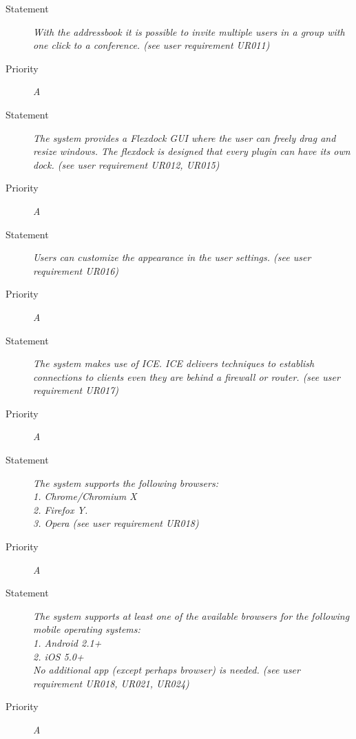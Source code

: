 \FR
\begin{description}
  \item[Statement]
    \textit{With the addressbook it is possible to invite multiple users in a group with one click to a conference. (see user requirement UR011)}
  \item[Priority]
    \textit{A}
\end{description}


\FR
\begin{description}
  \item[Statement]
    \textit{The system provides a \gls{Flexdock} GUI where the user can freely drag and resize windows. The flexdock is designed that every plugin can have its own dock. (see user requirement UR012, UR015)}
  \item[Priority]
    \textit{A}
\end{description}


\FR
\begin{description}
  \item[Statement]
    \textit{Users can customize the appearance in the user settings. (see user requirement UR016)}
  \item[Priority]
    \textit{A}
\end{description}


\FR
\begin{description}
  \item[Statement]
    \textit{The system makes use of \gls{ICE}. ICE delivers techniques to establish connections to clients even they are behind a firewall or router.  (see user requirement UR017)}
  \item[Priority]
    \textit{A}
\end{description}


\FR
\begin{description}
  \item[Statement]
    \textit{The system supports the following
      browsers:\\1. Chrome/Chromium X\\2. Firefox Y.\\ 3. Opera (see user requirement UR018)}
  \item[Priority]
    \textit{A}
\end{description}


\FR
\begin{description}
  \item[Statement]
    \textit{The system supports at least one of the available browsers
      for the following mobile operating systems:\\1. Android
      2.1+\\2. iOS 5.0+\\No additional app (except perhaps browser) is needed. (see user requirement UR018, UR021, UR024)}
  \item[Priority]
    \textit{A}
\end{description}


